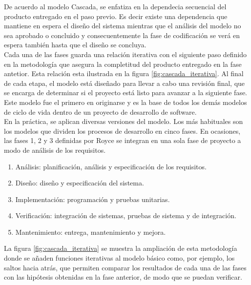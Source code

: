 De acuerdo al modelo Cascada, se enfatiza en la dependecia secuencial del producto entregado en el paso previo. Es decir existe una dependencia que mantiene en espera el diseño del sistema mientras que el análisis del modelo no sea aprobado o concluido y consecuentemente la fase de codificación se verá en espera también hasta que el diseño se concluya.\\

Cada una de las fases guarda una relación iterativa con el siguiente paso definido en la metodología que asegura la completitud del producto entregado en la fase antetior. Esta relación esta ilustrada en la figura \ref{fig:cascada_iterativa}. Al final de cada etapa, el modelo está diseñado para llevar a cabo una revisión final, que se encarga de determinar si el proyecto está listo para avanzar a la siguiente fase. Este modelo fue el primero en originarse y es la base de todos los demás modelos de ciclo de vida dentro de un proyecto de desarrollo de software.\\

En la práctica, se aplican diversas versiones del modelo. Los más habituales son los modelos que dividen los procesos de desarrollo en cinco fases. En ocasiones, las fases 1, 2 y 3 definidas por Royce se integran en una sola fase de proyecto a modo de análisis de los requisitos.\\

\begin{enumerate}
    \item Análisis: planificación, análisis y especificación de los requisitos.
    \item Diseño: diseño y especificación del sistema.
    \item Implementación: programación y pruebas unitarias.
    \item Verificación: integración de sistemas, pruebas de sistema y de integración.
    \item Mantenimiento: entrega, mantenimiento y mejora.
\end{enumerate}

La figura \ref{fig:cascada_iterativa} se muestra la ampliación de esta metodología donde se añaden funciones iterativas al modelo básico como, por ejemplo, los saltos hacia atrás, que permiten comparar los resultados de cada una de las fases con las hipótesis obtenidas en la fase anterior, de modo que se puedan verificar.\\

